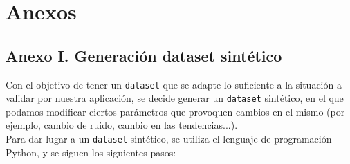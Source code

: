 \documentclass[a4paper, oneside, 12pt]{book}
\begin{document}
	\pagebreak
	
	\chapter*{Anexos}
	
	\section*{Anexo I. Generación dataset sintético}
	
	\noindent Con el objetivo de tener un \texttt{dataset} que se adapte lo suficiente a la situación a validar por nuestra aplicación, se decide generar un \texttt{dataset} sintético, en el que podamos modificar ciertos parámetros que provoquen cambios en el mismo (por ejemplo, cambio de ruido, cambio en las tendencias...). \\
	
	\noindent Para dar lugar a un \texttt{dataset} sintético, se utiliza el lenguaje de programación Python, y se siguen los siguientes pasos: 
	
\end{document}
